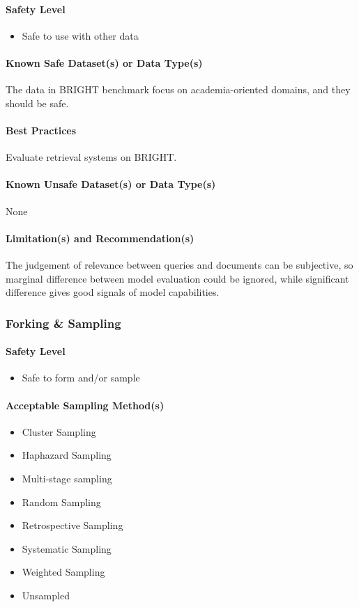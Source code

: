 \paragraph{Safety Level}
\begin{itemize}
    \item Safe to use with other data
\end{itemize}

\paragraph{Known Safe Dataset(s) or Data Type(s)}
The data in BRIGHT benchmark focus on academia-oriented domains, and they should be safe.

\paragraph{Best Practices}
Evaluate retrieval systems on BRIGHT.

\paragraph{Known Unsafe Dataset(s) or Data Type(s)}
None

\paragraph{Limitation(s) and Recommendation(s)}
The judgement of relevance between queries and documents can be subjective, so marginal difference between model evaluation could be ignored, while significant difference gives good signals of model capabilities.

\subsubsection{Forking \& Sampling}

\paragraph{Safety Level}
\begin{itemize}
    \item Safe to form and/or sample
\end{itemize}

\paragraph{Acceptable Sampling Method(s)}
\begin{itemize}
    \item Cluster Sampling
    \item Haphazard Sampling
    \item Multi-stage sampling
    \item Random Sampling
    \item Retrospective Sampling
    \item Systematic Sampling
    \item Weighted Sampling
    \item Unsampled
\end{itemize}

